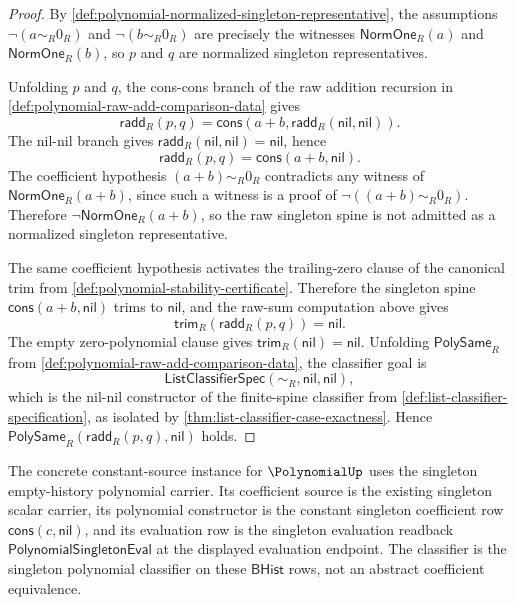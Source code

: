 \begin{proof}
By \autoref{def:polynomial-normalized-singleton-representative}, the assumptions $\neg(a\sim_R0_R)$ and $\neg(b\sim_R0_R)$ are precisely the witnesses $\mathsf{NormOne}_R(a)$ and $\mathsf{NormOne}_R(b)$, so $p$ and $q$ are normalized singleton representatives.

Unfolding $p$ and $q$, the cons-cons branch of the raw addition recursion in \autoref{def:polynomial-raw-add-comparison-data} gives
$$
\mathsf{radd}_R(p,q)
=\mathsf{cons}(a+b,\mathsf{radd}_R(\mathsf{nil},\mathsf{nil})).
$$
The nil-nil branch gives $\mathsf{radd}_R(\mathsf{nil},\mathsf{nil})=\mathsf{nil}$, hence
$$
\mathsf{radd}_R(p,q)=\mathsf{cons}(a+b,\mathsf{nil}).
$$
The coefficient hypothesis $(a+b)\sim_R0_R$ contradicts any witness of $\mathsf{NormOne}_R(a+b)$, since such a witness is a proof of $\neg((a+b)\sim_R0_R)$. Therefore $\neg\mathsf{NormOne}_R(a+b)$, so the raw singleton spine is not admitted as a normalized singleton representative.

The same coefficient hypothesis activates the trailing-zero clause of the canonical trim from \autoref{def:polynomial-stability-certificate}. Therefore the singleton spine $\mathsf{cons}(a+b,\mathsf{nil})$ trims to $\mathsf{nil}$, and the raw-sum computation above gives
$$
\mathsf{trim}_R(\mathsf{radd}_R(p,q))=\mathsf{nil}.
$$
The empty zero-polynomial clause gives $\mathsf{trim}_R(\mathsf{nil})=\mathsf{nil}$. Unfolding $\mathsf{PolySame}_R$ from \autoref{def:polynomial-raw-add-comparison-data}, the classifier goal is
$$
\mathsf{ListClassifierSpec}(\sim_R,\mathsf{nil},\mathsf{nil}),
$$
which is the nil-nil constructor of the finite-spine classifier from \autoref{def:list-classifier-specification}, as isolated by \autoref{thm:list-classifier-case-exactness}. Hence $\mathsf{PolySame}_R(\mathsf{radd}_R(p,q),\mathsf{nil})$ holds.
\end{proof}

\begin{definition}
\label{def:polynomial-singleton-constant-source-schema-instance}
The concrete constant-source instance for $\PolynomialUp$ uses the singleton empty-history polynomial carrier. Its coefficient source is the existing singleton scalar carrier, its polynomial constructor is the constant singleton coefficient row $\mathsf{cons}(c,\mathsf{nil})$, and its evaluation row is the singleton evaluation readback $\mathsf{PolynomialSingletonEval}$ at the displayed evaluation endpoint. The classifier is the singleton polynomial classifier on these $\mathsf{BHist}$ rows, not an abstract coefficient equivalence.
\end{definition}

